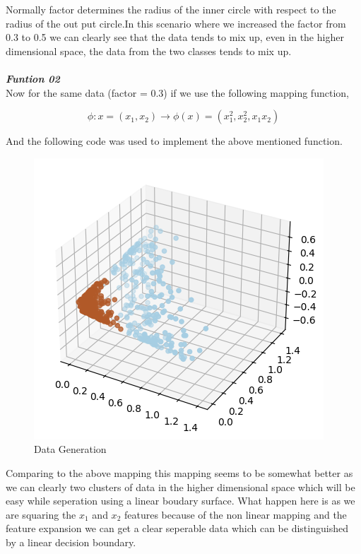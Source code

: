 \documentclass[11pt,a4paper]{article}
\begin{document}
Normally factor determines the radius of the inner circle with respect to the radius of the out put circle.In this scenario where we increased the factor from 0.3 to 0.5 we can clearly see that the data tends to mix up, even in the higher dimensional space, the data from the two classes tends to mix up.\\\\


\textbf{\textit{Funtion 02}}\\

Now for the same data (factor = 0.3) if we use the following mapping function,

\begin{equation}
    \phi : x = (x_1,x_2) \rightarrow \phi{(x)} =  (x_1^2,x_2^2,x_1x_2)
\end{equation}

\newpage

And the following code was used to implement the above mentioned function.

\lstset{style=mystyle}



{\begin{figure}[h]
    \centering
    \includegraphics[width=1.0\linewidth]{images/3.png}
    \caption{Data Generation}
\end{figure}}

Comparing to the above mapping this mapping seems to be somewhat better as we can clearly two clusters of data in the higher dimensional space which will be easy while seperation using a linear boudary surface. What happen here is as we are squaring the $x_{1}$ and $x_{2}$ features because of the non linear mapping and the feature expansion we can get a clear seperable data which can be distinguished by a linear decision boundary.\\\\
\end{document}
